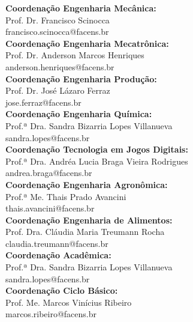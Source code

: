 \documentclass[
	12pt,				%
	oneside,			%
	a4paper,			%
	chapter=TITLE,		%
	section=TITLE,		%
	sumario=tradicional %
	english,			%
	french,				%
	spanish,			%
	brazil				%
	]{abntex2}
\begin{document}
\textbf{Coordenação Engenharia Mecânica:} \\ \indent Prof. Dr. Francisco Scinocca \\
\indent francisco.scinocca@facens.br \\

\textbf{Coordenação Engenharia Mecatrônica:} \\ \indent Prof. Dr. Anderson Marcos Henriques \\
\indent anderson.henriques@facens.br \\

\textbf{Coordenação Engenharia Produção:} \\ \indent Prof. Dr. José Lázaro Ferraz \\
\indent jose.ferraz@facens.br \\

\textbf{Coordenação Engenharia Química:} \\ \indent Prof.ª Dra. Sandra Bizarria Lopes Villanueva \\
\indent sandra.lopes@facens.br \\

\textbf{Coordenação Tecnologia em Jogos Digitais:} \\ \indent Prof.ª Dra. Andréa Lucia Braga Vieira Rodrigues \\
\indent andrea.braga@facens.br \\

\textbf{Coordenação Engenharia Agronômica:} \\ \indent Prof.ª Me. Thais Prado Avancini \\
\indent thais.avancini@facens.br \\

\textbf{Coordenação Engenharia de Alimentos:} \\ \indent Prof. Dra. Cláudia Maria Treumann Rocha \\
\indent claudia.treumann@facens.br \\

\textbf{Coordenação Acadêmica:} \\ \indent Prof.ª Dra. Sandra Bizarria Lopes Villanueva \\
\indent sandra.lopes@facens.br \\

\textbf{Coordenação Ciclo Básico:} \\ \indent Prof. Me. Marcos Vinícius Ribeiro \\
\indent marcos.ribeiro@facens.br \\
\end{document}
